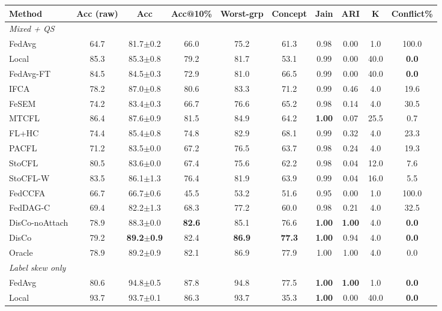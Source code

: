 \scriptsize
\setlength{\tabcolsep}{3.2pt}
\begin{tabular}{lccccccccc}
\toprule
Method & Acc (raw) & Acc & Acc@10\% & Worst-grp & Concept & Jain & ARI & K & Conflict\% \\
\midrule
\multicolumn{10}{l}{\textit{Mixed + QS}}\\
FedAvg & 64.7 & 81.7$\pm$0.2 & 66.0 & 75.2 & 61.3 & 0.98 & 0.00 & 1.0 & 100.0 \\
Local & 85.3 & 85.3$\pm$0.8 & 79.2 & 81.7 & 53.1 & 0.99 & 0.00 & 40.0 & \textbf{0.0} \\
FedAvg-FT & 84.5 & 84.5$\pm$0.3 & 72.9 & 81.0 & 66.5 & 0.99 & 0.00 & 40.0 & \textbf{0.0} \\
IFCA & 78.2 & 87.0$\pm$0.8 & 80.6 & 83.3 & 71.2 & 0.99 & 0.46 & 4.0 & 19.6 \\
FeSEM & 74.2 & 83.4$\pm$0.3 & 66.7 & 76.6 & 65.2 & 0.98 & 0.14 & 4.0 & 30.5 \\
MTCFL & 86.4 & 87.6$\pm$0.9 & 81.5 & 84.9 & 64.2 & \textbf{1.00} & 0.07 & 25.5 & 0.7 \\
FL+HC & 74.4 & 85.4$\pm$0.8 & 74.8 & 82.9 & 68.1 & 0.99 & 0.32 & 4.0 & 23.3 \\
PACFL & 71.2 & 83.5$\pm$0.0 & 67.2 & 76.5 & 63.7 & 0.98 & 0.24 & 4.0 & 19.3 \\
StoCFL & 80.5 & 83.6$\pm$0.0 & 67.4 & 75.6 & 62.2 & 0.98 & 0.04 & 12.0 & 7.6 \\
StoCFL-W & 83.5 & 86.1$\pm$1.3 & 76.4 & 81.9 & 63.9 & 0.99 & 0.04 & 16.0 & 5.5 \\
FedCCFA & 66.7 & 66.7$\pm$0.6 & 45.5 & 53.2 & 51.6 & 0.95 & 0.00 & 1.0 & 100.0 \\
FedDAG-C & 69.4 & 82.2$\pm$1.3 & 68.3 & 77.2 & 60.0 & 0.98 & 0.21 & 4.0 & 32.5 \\
DisCo-noAttach & 78.9 & 88.3$\pm$0.0 & \textbf{82.6} & 85.1 & 76.6 & \textbf{1.00} & \textbf{1.00} & 4.0 & \textbf{0.0} \\
DisCo & 79.2 & \textbf{89.2$\pm$0.9} & 82.4 & \textbf{86.9} & \textbf{77.3} & \textbf{1.00} & 0.94 & 4.0 & \textbf{0.0} \\
Oracle & 78.9 & 89.2$\pm$0.9 & 82.1 & 86.9 & 77.9 & 1.00 & 1.00 & 4.0 & 0.0 \\
\midrule
\multicolumn{10}{l}{\textit{Label skew only}}\\
FedAvg & 80.6 & 94.8$\pm$0.5 & 87.8 & 94.8 & 77.5 & \textbf{1.00} & \textbf{1.00} & 1.0 & \textbf{0.0} \\
Local & 93.7 & 93.7$\pm$0.1 & 86.3 & 93.7 & 35.3 & \textbf{1.00} & 0.00 & 40.0 & \textbf{0.0} \\

\end{tabular}
